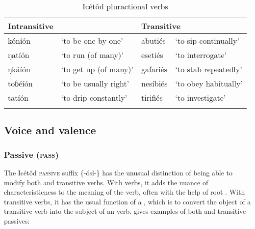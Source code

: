 \begin{table}
\caption{Icétôd pluractional verbs}
\label{tab:verbs:pluract}


\begin{tabularx}{\textwidth}{XlXl}
\lsptoprule

Intransitive &  & \multicolumn{2}{X}{Transitive}\\
\midrule
kóníón & ‘to be one-by-one’ & abutiés & ‘to sip continually’\\
ŋatíón & ‘to run (of many)’ & esetiés & ‘to interrogate’\\
ŋkáíón & ‘to get up (of many)’ & gafariés & ‘to stab repeatedly’\\
toɓéíón & ‘to be usually right’ & nesíbiés & ‘to obey habitually’\\
tatíón & ‘to drip constantly’ & tirifiés & ‘to investigate’\\
\lspbottomrule
\end{tabularx}
\end{table}



\subsection{Voice and valence}\label{sec:8.6}
\subsubsection{Passive (\textsc{pass})}\label{sec:8.6.1}

The Icétôd \textsc{passive} suffix \{-ósí-\} has the unusual distinction of being able to modify both  and transitive verbs. With  verbs, it adds the nuance of characteristicness to the meaning of the verb, often with the help of root . With transitive verbs, it has the usual function of a , which is to convert the object of a transitive verb into the subject of an  verb.  gives examples of both  and transitive passives:


